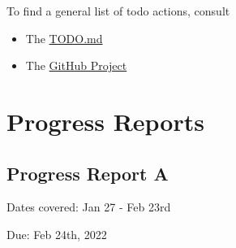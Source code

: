 \documentclass[sigplan,screen]{acmart}
\begin{document}
To find a general list of todo actions, consult

\begin{itemize}
\item The \href{https://github.com/cybertraining-dsc/capstone-eartquake/blob/main/TODO.md}{TODO.md} 
\item The \href{https://github.com/Data-ScienceHub/mlcommons-science/projects/1}{GitHub Project}
\end{itemize}

\section{Progress Reports}

\subsection{Progress Report A}

Dates covered: Jan 27 - Feb 23rd

Due: Feb 24th, 2022
\end{document}
